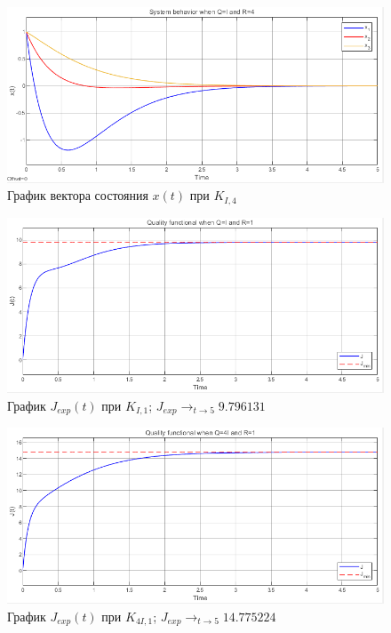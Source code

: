 \documentclass[a4paper, 12pt]{article}
\begin{document}
    \begin{figure}[H]
        \centering
        \includegraphics[scale=0.75]{1task_xxx.png}
        \captionsetup{skip=0pt}
        \caption{График вектора состояния $x(t)$ при $K_{I,4}$}
        \label{fig:1task_xxx}
    \end{figure}
    \begin{figure}[H]
        \centering
        \includegraphics[scale=0.75]{1task_j.png}
        \captionsetup{skip=0pt}
        \caption{График $J_{exp}(t)$ при $K_{I,1}$; $J_{exp}\rightarrow_{t\to5} 9.796131$}
        \label{fig:1task_j}
    \end{figure}
    \begin{figure}[H]
        \centering
        \includegraphics[scale=0.75]{1task_jj.png}
        \captionsetup{skip=0pt}
        \caption{График $J_{exp}(t)$ при $K_{4I,1}$; $J_{exp}\rightarrow_{t\to5} 14.775224$}
        \label{fig:1task_jj}
    \end{figure}
\end{document}
